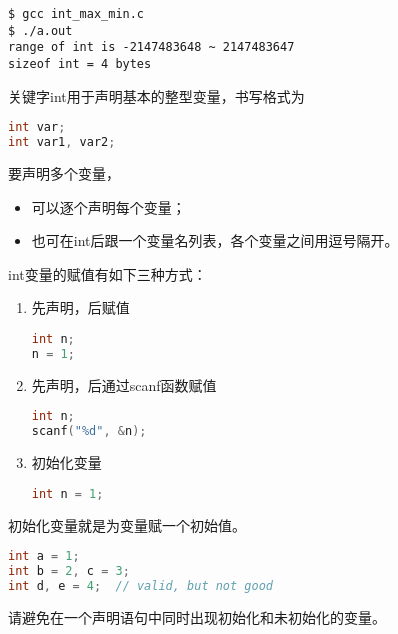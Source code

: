 \begin{frame}[fragile]
\begin{lstlisting}[backgroundcolor=\color{red!10}]
$ gcc int_max_min.c
$ ./a.out
range of int is -2147483648 ~ 2147483647
sizeof int = 4 bytes
\end{lstlisting}
\end{frame}
%
\begin{frame}[fragile]
关键字int用于声明基本的整型变量，书写格式为
\begin{lstlisting}[language=c,backgroundcolor=\color{red!10}]
int var;
int var1, var2;
\end{lstlisting}  \vspace{0.05in}

要声明多个变量，\vspace{0.05in}
\begin{itemize}
\item 可以逐个声明每个变量；\\[0.1in]
\item 也可在int后跟一个变量名列表，各个变量之间用逗号隔开。
\end{itemize}

\end{frame}
%
\begin{frame}[fragile]
int变量的赋值有如下三种方式：\vspace{0.05in}

\begin{enumerate}
\item 先声明，后赋值
\begin{lstlisting}[language=c,backgroundcolor=\color{red!10}]
int n;
n = 1;
\end{lstlisting}
\item 先声明，后通过scanf函数赋值
\begin{lstlisting}[language=c,backgroundcolor=\color{red!10}]
int n;
scanf("%d", &n);
\end{lstlisting} 
\item 初始化变量
\begin{lstlisting}[language=c,backgroundcolor=\color{red!10}]
int n = 1;
\end{lstlisting} 
\end{enumerate}
\end{frame}
%
%
\begin{frame}[fragile]
初始化变量就是为变量赋一个初始值。
\begin{lstlisting}[language=c,backgroundcolor=\color{red!10}]
int a = 1;
int b = 2, c = 3;
int d, e = 4;  // valid, but not good
\end{lstlisting}
请避免在一个声明语句中同时出现初始化和未初始化的变量。
\end{frame}
